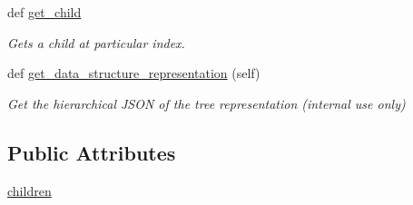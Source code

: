 \begin{DoxyCompactItemize}
def \hyperlink{classbridges_1_1tree__element_1_1_tree_element_a137df45ceccca2cf489ea6df5719400e}{get\+\_\+child}
\begin{DoxyCompactList}\small\item\em Gets a child at particular index. \end{DoxyCompactList}\item 
def \hyperlink{classbridges_1_1tree__element_1_1_tree_element_ac578f7744d2553c91962b01b57b0e783}{get\+\_\+data\+\_\+structure\+\_\+representation} (self)
\begin{DoxyCompactList}\small\item\em Get the hierarchical J\+S\+ON of the tree representation (internal use only) \end{DoxyCompactList}\end{DoxyCompactItemize}
\subsection*{Public Attributes}
\begin{DoxyCompactItemize}
\item 
\hyperlink{classbridges_1_1tree__element_1_1_tree_element_a09e0e8ad32395e004b6b2d12c39ce390}{children}
\end{DoxyCompactItemize}
